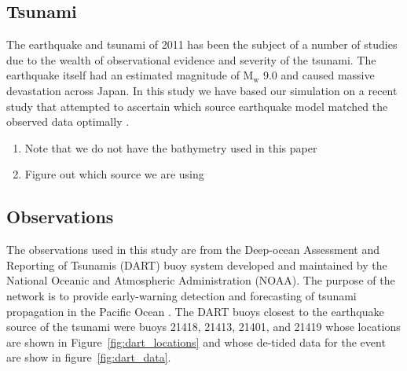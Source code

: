 \subsection{\tohoku Tsunami}

The \tohoku earthquake and tsunami of 2011 has been the subject of a number of studies due to the wealth of observational evidence and severity of the tsunami.  The earthquake itself had an estimated magnitude of $\text{M}_\text{w}$ 9.0 and caused massive devastation across Japan.  In this study we have based our simulation on a recent study that attempted to ascertain which source earthquake model matched the observed data optimally \cite{MacInnes:2013cr}.  

\begin{enumerate}
    \item Note that we do not have the bathymetry used in this paper
    \item Figure out which source we are using
\end{enumerate}

\subsection{Observations}

The observations used in this study are from the Deep-ocean Assessment and Reporting of Tsunamis (DART) buoy system developed and maintained by the National Oceanic and Atmospheric Administration (NOAA).  The purpose of the network is to provide early-warning detection and forecasting of tsunami propagation in the Pacific Ocean \cite{Percival:2011}.  The DART buoys closest to the earthquake source of the \tohoku tsunami were buoys 21418, 21413, 21401, and 21419 whose locations are shown in Figure~\ref{fig:dart_locations} and whose de-tided data for the event are show in figure~\ref{fig:dart_data}.


